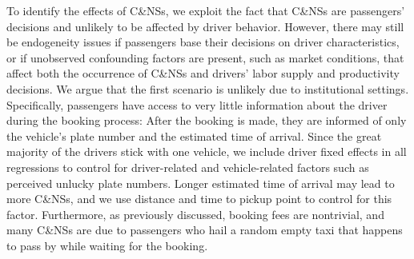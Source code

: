 \documentclass[reviewmode]{AEA}
\begin{document}
To identify the effects of C\&NSs, we exploit the fact that C\&NSs are passengers' decisions and unlikely to be affected by driver behavior. However, there may still be endogeneity issues if passengers base their decisions on driver characteristics, or if unobserved confounding factors are present, such as market conditions, that affect both the occurrence of C\&NSs and drivers' labor supply and productivity decisions. We argue that the first scenario is unlikely due to institutional settings. Specifically, passengers have access to very little information about the driver during the booking process: After the booking is made, they are informed of only the vehicle's plate number and the estimated time of arrival. Since the great majority of the drivers stick with one vehicle, we include driver fixed effects in all regressions to control for driver-related and vehicle-related factors such as perceived unlucky plate numbers. Longer estimated time of arrival may lead to more C\&NSs, and we use distance and time to pickup point to control for this factor. 
Furthermore, as previously discussed, booking fees are nontrivial, and many C\&NSs are due to passengers who hail a random empty taxi that happens to pass by while waiting for the booking. 
\end{document}
